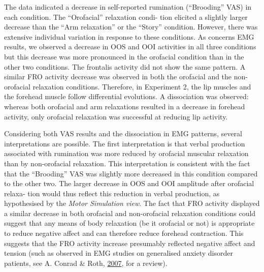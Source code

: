 \documentclass[a4paper,12pt,twoside,openright,oldfontcommands]{memoir}
\begin{document}
The data indicated a decrease in self-reported rumination (``Brooding''
VAS) in each condition. The ``Orofacial'' relaxation condi- tion
elicited a slightly larger decrease than the ``Arm relaxation'' or the
``Story'' condition. However, there was extensive individual variation
in response to these conditions. As concerns EMG results, we observed a
decrease in OOS and OOI activities in all three conditions but this
decrease was more pronounced in the orofacial condition than in the
other two conditions. The frontalis activity did not show the same
pattern. A similar FRO activity decrease was observed in both the
orofacial and the non-orofacial relaxation conditions. Therefore, in
Experiment 2, the lip muscles and the forehead muscle follow
differential evolutions. A dissociation was observed: whereas both
orofacial and arm relaxations resulted in a decrease in forehead
activity, only orofacial relaxation was successful at reducing lip
activity.

Considering both VAS results and the dissociation in EMG patterns,
several interpretations are possible. The first interpretation is that
verbal production associated with rumination was more reduced by
orofacial muscular relaxation than by non-orofacial relaxation. This
interpretation is consistent with the fact that the ``Brooding'' VAS was
slightly more decreased in this condition compared to the other two. The
larger decrease in OOS and OOI amplitude after orofacial relaxa- tion
would thus reflect this reduction in verbal production, as hypothesised
by the \emph{Motor Simulation view}. The fact that FRO activity
displayed a similar decrease in both orofacial and non-orofacial
relaxation conditions could suggest that any means of body relaxation
(be it orofacial or not) is appropriate to reduce negative affect and
can therefore reduce forehead contraction. This suggests that the FRO
activity increase presumably reflected negative affect and tension (such
as observed in EMG studies on generalised anxiety disorder patients, see
A. Conrad \& Roth, \protect\hyperlink{ref-conrad_muscle_2007}{2007}, for
a review).
\end{document}
